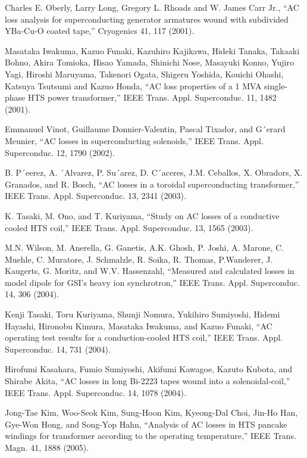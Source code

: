 \noindent [7.76] Charles E. Oberly, Larry Long, Gregory L. Rhoads and W. James Carr Jr.,
 ``AC loss analysis for superconducting generator armatures wound with subdivided YBa-Cu-O coated tape,” Cryogenics 41, 117 (2001).

\noindent [7.77] Masataka Iwakuma, Kazuo Funaki, Kazuhiro Kajikawa, Hideki Tanaka, Takaaki Bohno, Akira Tomioka, Hisao Yamada, 
Shinichi Nose, Masayuki Konno, Yujiro Yagi, Hiroshi Maruyama, Takenori Ogata, Shigeru Yoshida, Kouichi Ohashi, Katsuya Tsutsumi and Kazuo Honda, 
``AC loss properties of a 1 MVA single-phase HTS power transformer,” IEEE Trans. Appl. Superconduc. 11, 1482 (2001).

\noindent [7.78] Emmanuel Vinot, Guillaume Donnier-Valentin, Pascal Tixador, and G´erard Meunier,
``AC losses in superconducting solenoids,” IEEE Trans. Appl. Superconduc.
12, 1790 (2002).

\noindent [7.79] B. P´eerez, A. ´Alvarez, P. Su´arez, D. C´aceres, J.M. Ceballos, X. Obradors, X. Granados,
and R. Bosch, ``AC losses in a toroidal superconducting transformer,” IEEE
Trans. Appl. Superconduc. 13, 2341 (2003).

\noindent [7.80] K. Tasaki, M. Ono, and T. Kuriyama, ``Study on AC losses of a conductive cooled
HTS coil,” IEEE Trans. Appl. Superconduc. 13, 1565 (2003).

\noindent [7.81] M.N. Wilson, M. Anerella, G. Ganetis, A.K. Ghosh, P. Joshi, A. Marone, C.
Muehle, C. Muratore, J. Schmalzle, R. Soika, R. Thomas, P.Wanderer, J. Kaugerts,
G. Moritz, and W.V. Hassenzahl, ``Measured and calculated losses in model dipole
for GSI’s heavy ion synchrotron,” IEEE Trans. Appl. Superconduc. 14, 306 (2004).

\noindent [7.82] Kenji Tasaki, Toru Kuriyama, Shunji Nomura, Yukihiro Sumiyoshi, Hidemi Hayashi,
Hironobu Kimura, Masataka Iwakuma, and Kazuo Funaki, ``AC operating test
results for a conduction-cooled HTS coil,” IEEE Trans. Appl. Superconduc. 14,
731 (2004).

\noindent [7.83] Hirofumi Kasahara, Fumio Sumiyoshi, Akifumi Kawagoe, Kazuto Kubota, and Shirabe Akita, 
``AC losses in long Bi-2223 tapes wound into a solenoidal-coil,” IEEE Trans. Appl. Superconduc. 14, 1078 (2004).

\noindent [7.84] Jong-Tae Kim, Woo-Seok Kim, Sung-Hoon Kim, Kyeong-Dal Choi, Jin-Ho Han, Gye-Won Hong, and Song-Yop Hahn,
 ``Analysis of AC losses in HTS pancake windings for transformer according to the operating temperature,” IEEE Trans.
Magn. 41, 1888 (2005).

